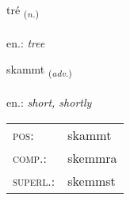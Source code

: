 \documentclass[frontgrid, backgrid]{flacards}\usepackage[]{graphicx}\usepackage[]{xcolor}
\begin{document}
\renewcommand{\flhead}{\vskip5pt \fboxsep=0pt {\small\bfseries\footnotesize Nafnorð | Noun}}
\renewcommand{\fcfoot}{\vskip5pt \fboxsep=0pt \hspace{2pt}{\small\bfseries\footnotesize 2K}}

\renewcommand{\blhead}{\vskip5pt {\small\bfseries\footnotesize Nafnorð | Noun }}
\renewcommand{\bcfoot}{\vskip5pt \hspace{2pt}{\small\bfseries\footnotesize 2K}}


{tré \small{\textsubscript{(\textit{n.})}} \\[1ex] %
\textphonetic{[tʰrjɛː]} \\
en.: \emph{tree} \\  [2ex]
\renewcommand*{\arraystretch}{0.8}
}

\renewcommand{\flhead}{\vskip5pt \fboxsep=0pt {\small\bfseries\footnotesize Atviksorð | Adverb}}
\renewcommand{\fcfoot}{\vskip5pt \fboxsep=0pt \hspace{2pt}{\small\bfseries\footnotesize 2K}}

\renewcommand{\blhead}{\vskip5pt {\small\bfseries\footnotesize Atviksorð | Adverb }}
\renewcommand{\bcfoot}{\vskip5pt \hspace{2pt}{\small\bfseries\footnotesize 2K}}


{skammt \small{\textsubscript{(\textit{adv.})}} \\[1ex] %
\textphonetic{[skam̥t]} \\
en.: \emph{short, shortly} \\  [2ex]
\renewcommand*{\arraystretch}{0.8}
\begin{tabular}{ll}
\textsc{pos}: & skammt \\ 
\textsc{comp.}: & skemmra \\ 
\textsc{superl.}: & skemmst \\
\end{tabular}
}
\end{document}
